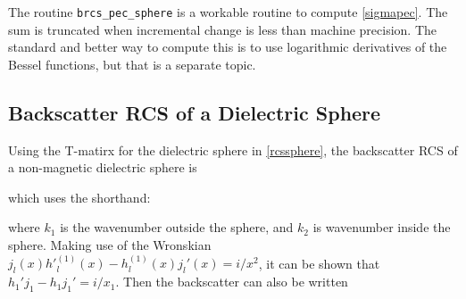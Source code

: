 The routine \texttt{brcs\_pec\_sphere} is a workable routine to compute \eqref{sigmapec}. The sum is truncated when incremental change is less than machine precision. The standard and better way to compute this is to use logarithmic derivatives of the Bessel functions, but that is a separate topic.

{\footnotesize
{}
}

\subsection{Backscatter RCS of a Dielectric Sphere}

Using the T-matirx for the dielectric sphere in \eqref{rcssphere}, the backscatter RCS of a non-magnetic dielectric sphere is 

which uses the shorthand: 

\noindent where $k_1$ is the wavenumber outside the sphere, and $k_2$ is wavenumber inside the sphere.  Making use of the Wronskian $j_l(x) {h'}_l^{(1)}(x) - h_l^{(1)}(x) j_l'(x) = i/x^2$, it can be shown that $h_1' j_1 - h_1 j_1'  = i/x_1$.  Then the backscatter can also be written 


